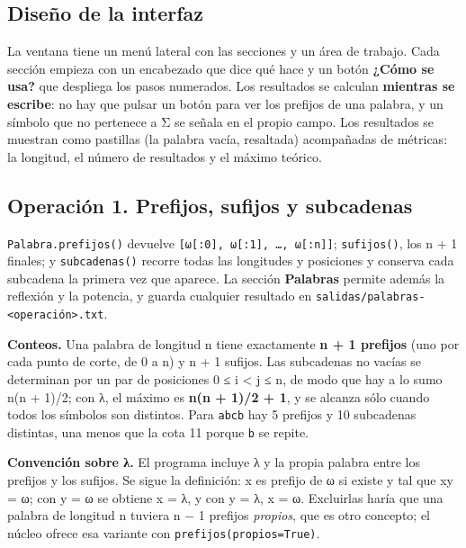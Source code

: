 \hypertarget{diseuxf1o-de-la-interfaz}{%
\subsection{Diseño de la interfaz}\label{diseuxf1o-de-la-interfaz}}

La ventana tiene un menú lateral con las secciones y un área de trabajo. Cada sección empieza con un encabezado que dice qué hace y un botón \textbf{¿Cómo se usa?} que despliega los pasos numerados. Los resultados se calculan \textbf{mientras se escribe}: no hay que pulsar un botón para ver los prefijos de una palabra, y un símbolo que no pertenece a Σ se señala en el propio campo. Los resultados se muestran como pastillas (la palabra vacía, resaltada) acompañadas de métricas: la longitud, el número de resultados y el máximo teórico.

\hypertarget{operaciuxf3n-1.-prefijos-sufijos-y-subcadenas}{%
\subsection{Operación 1. Prefijos, sufijos y subcadenas}\label{operaciuxf3n-1.-prefijos-sufijos-y-subcadenas}}

\texttt{Palabra.prefijos()} devuelve \texttt{{[}ω{[}:0{]},\ ω{[}:1{]},\ …,\ ω{[}:n{]}{]}}; \texttt{sufijos()}, los n + 1 finales; y \texttt{subcadenas()} recorre todas las longitudes y posiciones y conserva cada subcadena la primera vez que aparece. La sección \textbf{Palabras} permite además la reflexión y la potencia, y guarda cualquier resultado en \texttt{salidas/palabras-\textless{}operación\textgreater{}.txt}.

\textbf{Conteos.} Una palabra de longitud n tiene exactamente \textbf{n + 1 prefijos} (uno por cada punto de corte, de 0 a n) y n + 1 sufijos. Las subcadenas no vacías se determinan por un par de posiciones 0 ≤ i \textless{} j ≤ n, de modo que hay a lo sumo n(n + 1)/2; con λ, el máximo es \textbf{n(n + 1)/2 + 1}, y se alcanza sólo cuando todos los símbolos son distintos. Para \texttt{abcb} hay 5 prefijos y 10 subcadenas distintas, una menos que la cota 11 porque \texttt{b} se repite.

\textbf{Convención sobre λ.} El programa incluye λ y la propia palabra entre los prefijos y los sufijos. Se sigue la definición: x es prefijo de ω si existe y tal que xy = ω; con y = ω se obtiene x = λ, y con y = λ, x = ω. Excluirlas haría que una palabra de longitud n tuviera n − 1 prefijos \emph{propios}, que es otro concepto; el núcleo ofrece esa variante con \texttt{prefijos(propios=True)}.

